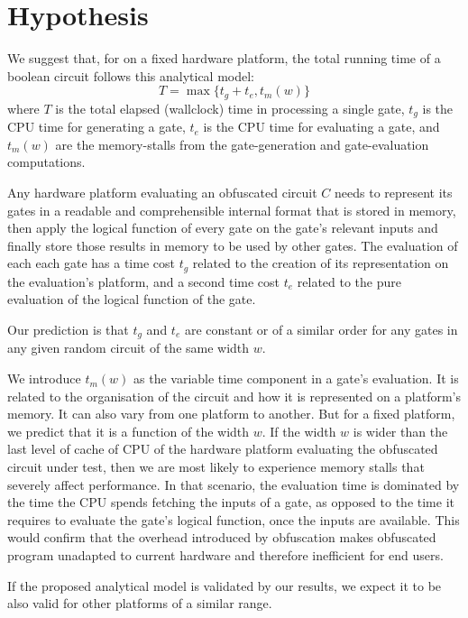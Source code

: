\section{Hypothesis}
We suggest that, for on a fixed hardware platform, the total running time of a boolean
circuit follows this analytical model:
\begin{equation} \label{eq:1}
T = \max\{ t_g + t_e, t_m(w) \}
\end{equation}
where $T$ is the total elapsed (wallclock) time in processing a single gate, $t_g$
is the CPU time for generating a gate, $t_e$ is the CPU time for evaluating a gate,
and $t_m(w)$ are the memory-stalls from the gate-generation and gate-evaluation
computations.
\par
Any hardware platform evaluating an obfuscated circuit $C$ needs to represent its gates
in a readable and comprehensible internal format that is stored in memory, then apply the logical function of every
gate on the gate's relevant inputs and finally store those results in memory to be used by other gates.
The evaluation of each each gate has a time cost $t_g$ related to the creation of its
representation on the evaluation's platform, and a second time cost $t_e$ related
to the pure evaluation of the logical function of the gate.
\par
Our prediction is that $t_g$ and $t_e$ are constant or of a similar order for any gates in
any given random circuit of the same width $w$.
\par
We introduce $t_m(w)$ as the variable time component in a gate's evaluation. It
is related to the organisation of the circuit and how it is represented on a platform's
memory. It can also vary from one platform to another. But for a fixed platform, we predict that it is a function of the width $w$.
If the width $w$ is wider than the last level of cache of CPU of the hardware platform
evaluating the obfuscated circuit under test, then we are most likely to experience
memory stalls that severely affect performance. In that scenario, the evaluation time
is dominated by the time the CPU spends fetching the inputs of a gate, as opposed
to the time it requires to evaluate the gate's logical function, once the inputs are
available. This would confirm that the overhead introduced by obfuscation makes obfuscated
program unadapted to current hardware and therefore inefficient for end users.
\par
If the proposed analytical model is validated by our results, we expect it to be
also valid for other platforms of a similar range.
